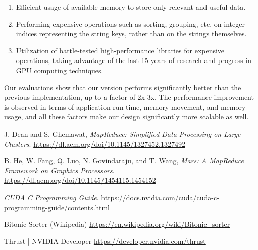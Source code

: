 \documentclass{article}
\begin{document}
\begin{enumerate}
    \item Efficient usage of available memory to store only relevant and useful data.
    \item Performing expensive operations such as sorting, grouping, etc. on integer indices representing the string keys, rather than on the strings themselves.
    \item Utilization of battle-tested high-performance libraries for expensive operations, taking advantage of the last 15 years of research and progress in GPU computing techniques.
\end{enumerate}

Our evaluations show that our version performs significantly better than the previous implementation, up to a factor of 2x-3x. The performance improvement is observed in terms of application run time, memory movement, and memory usage, and all these factors make our design significantly more scalable as well. 

\begin{thebibliography}
\raggedright

J. Dean and S. Ghemawat, \textit{MapReduce: Simplified Data Processing on Large Clusters}. \href{https://dl.acm.org/doi/10.1145/1327452.1327492}{https://dl.acm.org/doi/10.1145/1327452.1327492}

B. He, W. Fang, Q. Luo, N. Govindaraju, and T. Wang, \textit{Mars: A MapReduce Framework on Graphics Processors}. \href{https://dl.acm.org/doi/10.1145/1454115.1454152}{https://dl.acm.org/doi/10.1145/1454115.1454152}

\textit{CUDA C Programming Guide}. \href{https://docs.nvidia.com/cuda/cuda-c-programming-guide/contents.html}{https://docs.nvidia.com/cuda/cuda-c-programming-guide/contents.html}

Bitonic Sorter (Wikipedia) \href{https://en.wikipedia.org/wiki/Bitonic_sorter}{https://en.wikipedia.org/wiki/Bitonic\_sorter}

Thrust | NVIDIA Developer \href{https://developer.nvidia.com/thrust}{https://developer.nvidia.com/thrust}

\end{thebibliography}
\end{document}
